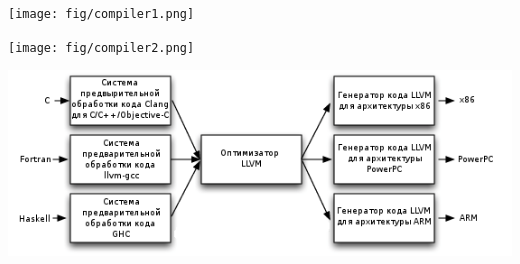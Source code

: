 
\noindent\texttt{[image: fig/compiler1.png]}

\pagebreak
\noindent\texttt{[image: fig/compiler2.png]}

\noindent\includegraphics[width=\textwidth]{fig/llvm.png}

\secup
